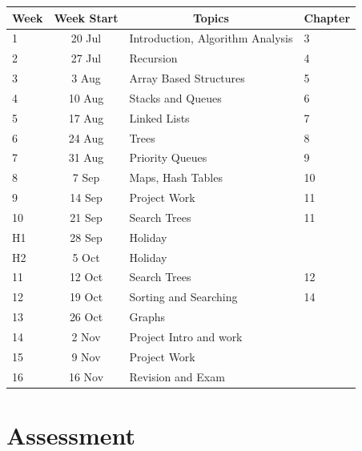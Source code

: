 \documentclass{article}
\begin{document}
\renewcommand{\arraystretch}{1.5}
\begin{tabular}{|l|c|l|l|}
\hline
 Week & Week Start & \multicolumn{1}{c|}{Topics}               & Chapter   \\ \hline
 1    & 20 Jul     & Introduction, Algorithm Analysis          &   3 \\ \hline
 2    & 27 Jul     & Recursion                                 &   4 \\ \hline
 3    &  3 Aug     & Array Based Structures                    &   5 \\ \hline
 4    & 10 Aug     & Stacks and Queues                         &   6 \\ \hline
 5    & 17 Aug     & Linked Lists                              &   7 \\ \hline
 6    & 24 Aug     & Trees                                     &   8\\ \hline
 7    & 31 Aug     & Priority Queues                           &   9\\ \hline
 8    &  7 Sep     & Maps, Hash Tables                         &   10 \\ \hline
 9    & 14 Sep     & Project Work                              &   11 \\ \hline
 10   & 21 Sep     & Search Trees                              &   11 \\ \hline
 H1   & 28 Sep     & Holiday                                   &    \\ \hline
 H2   &  5 Oct     & Holiday                                   &    \\ \hline
 11   & 12 Oct     & Search Trees                              &   12 \\ \hline
 12   & 19 Oct     & Sorting and Searching                     &   14 \\ \hline
 13   & 26 Oct     & Graphs                                    &   \\ \hline
 14   &  2 Nov     & Project Intro and work                    &   \\ \hline
 15   &  9 Nov     & Project Work                              &   \\ \hline
 16   & 16 Nov     & Revision and Exam                         &   \\ \hline
\end{tabular}

\section*{Assessment}
\end{document}
